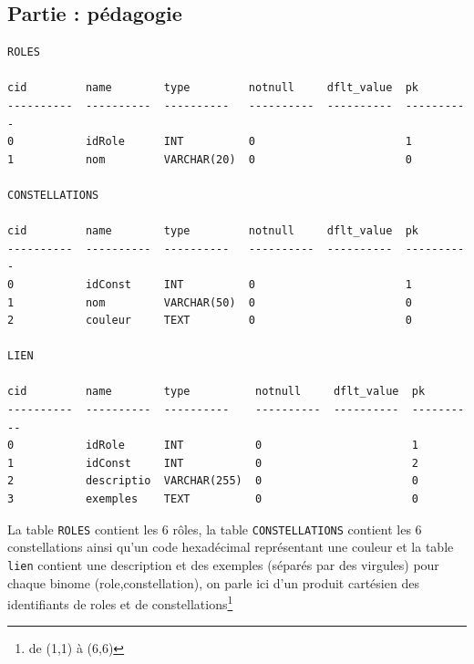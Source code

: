 \documentclass[a4paper, 12pt]{article}
\begin{document}
\subsection{Partie : pédagogie} 
\begin{verbatim}
ROLES

cid         name        type         notnull     dflt_value  pk        
----------  ----------  ----------   ----------  ----------  ----------
0           idRole      INT          0                       1         
1           nom         VARCHAR(20)  0                       0        

CONSTELLATIONS

cid         name        type         notnull     dflt_value  pk        
----------  ----------  ----------   ----------  ----------  ----------
0           idConst     INT          0                       1         
1           nom         VARCHAR(50)  0                       0         
2           couleur     TEXT         0                       0      

LIEN

cid         name        type          notnull     dflt_value  pk        
----------  ----------  ----------    ----------  ----------  ----------
0           idRole      INT           0                       1         
1           idConst     INT           0                       2         
2           descriptio  VARCHAR(255)  0                       0         
3           exemples    TEXT          0                       0      
\end{verbatim}
La table \verb+ROLES+ contient les 6 rôles, la table \verb+CONSTELLATIONS+ contient les 6 constellations ainsi qu'un code hexadécimal représentant une couleur et la table \verb+lien+ contient une description et des exemples (séparés par des virgules) pour chaque binome (role,constellation), on parle ici d'un produit cartésien des identifiants de roles et de constellations\footnote{de (1,1) à (6,6)}
\end{document}
